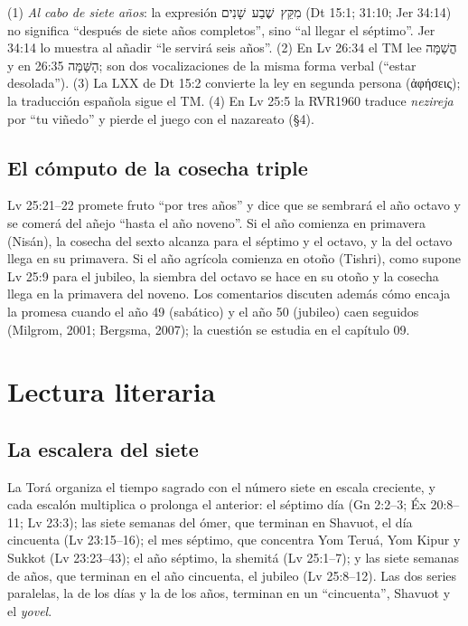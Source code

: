\documentclass[11pt,letterpaper]{article}
\newcommand{\heb}[1]{\mbox{\foreignlanguage{hebrew}{#1}}}
\newcommand{\grc}[1]{\foreignlanguage{ancientgreek}{#1}}
\begin{document}
\begin{nota}
(1) \emph{Al cabo de siete años}: la expresión \heb{מִקֵּץ שֶׁבַע שָׁנִים} (Dt 15:1; 31:10; Jer 34:14) no significa ``después de siete años completos'', sino ``al llegar el séptimo''. Jer 34:14 lo muestra al añadir ``le servirá seis años''. (2) En Lv 26:34 el TM lee \heb{הֳשַׁמָּה} y en 26:35 \heb{הָשַּׁמָּה}; son dos vocalizaciones de la misma forma verbal (``estar desolada''). (3) La LXX de Dt 15:2 convierte la ley en segunda persona (\grc{ἀφήσεις}); la traducción española sigue el TM. (4) En Lv 25:5 la RVR1960 traduce \emph{nezireja} por ``tu viñedo'' y pierde el juego con el nazareato (§4).
\end{nota}

\subsection{El cómputo de la cosecha triple}
Lv 25:21--22 promete fruto ``por tres años'' y dice que se sembrará el año octavo y se comerá del añejo ``hasta el año noveno''. Si el año comienza en primavera (Nisán), la cosecha del sexto alcanza para el séptimo y el octavo, y la del octavo llega en su primavera. Si el año agrícola comienza en otoño (Tishri), como supone Lv 25:9 para el jubileo, la siembra del octavo se hace en su otoño y la cosecha llega en la primavera del noveno. Los comentarios discuten además cómo encaja la promesa cuando el año 49 (sabático) y el año 50 (jubileo) caen seguidos (Milgrom, 2001; Bergsma, 2007); la cuestión se estudia en el capítulo 09.

\section{Lectura literaria}

\subsection{La escalera del siete}
La Torá organiza el tiempo sagrado con el número siete en escala creciente, y cada escalón multiplica o prolonga el anterior: el séptimo día (Gn 2:2--3; Éx 20:8--11; Lv 23:3); las siete semanas del ómer, que terminan en Shavuot, el día cincuenta (Lv 23:15--16); el mes séptimo, que concentra Yom Teruá, Yom Kipur y Sukkot (Lv 23:23--43); el año séptimo, la shemitá (Lv 25:1--7); y las siete semanas de años, que terminan en el año cincuenta, el jubileo (Lv 25:8--12). Las dos series paralelas, la de los días y la de los años, terminan en un ``cincuenta'', Shavuot y el \emph{yovel}.
\end{document}
